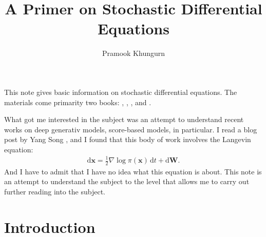\documentclass[10pt]{article}
\title{A Primer on Stochastic Differential Equations}
\author{Pramook Khungurn}
\newcommand{\dee}{\mathrm{d}}
\newcommand{\ve}[1]{\mathbf{#1}}
\begin{document}
\maketitle

This note gives basic information on stochastic differential equations. The materials come primarity two books: \cite{Evans:2013}, \cite{Morters:2012}, \cite{Sarkka:2012}, and \cite{Mikosch:1998}.

What got me interested in the subject was an attempt to understand recent works on deep generativ models, score-based models, in particular. I read a blog post by Yang Song \cite{Song:2021}, and I found that this body of work involves the Langevin equation:
\begin{align*}
  \dee\ve{x} = \frac{1}{2} \nabla \log \pi(\ve{x})\, \dee t + \dee\ve{W}.
\end{align*}
And I have to admit that I have no idea what this equation is about. This note is an attempt to understand the subject to the level that allows me to carry out further reading into the subject.

\section{Introduction}
\end{document}
